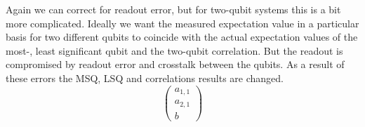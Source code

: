 Again we can correct for readout error, but for two-qubit systems this is a bit more complicated. Ideally we want the measured expectation value in a particular basis for two different qubits to coincide with the actual expectation values of the most-, least significant qubit and the two-qubit correlation. But the readout is compromised by readout error and crosstalk between the qubits. As a result of these errors the MSQ, LSQ and correlations results are changed.
\begin{equation}
\begin{pmatrix}
a_{1,1}  \\
a_{2,1}  \\
b 
\end{pmatrix}
\end{equation}












 